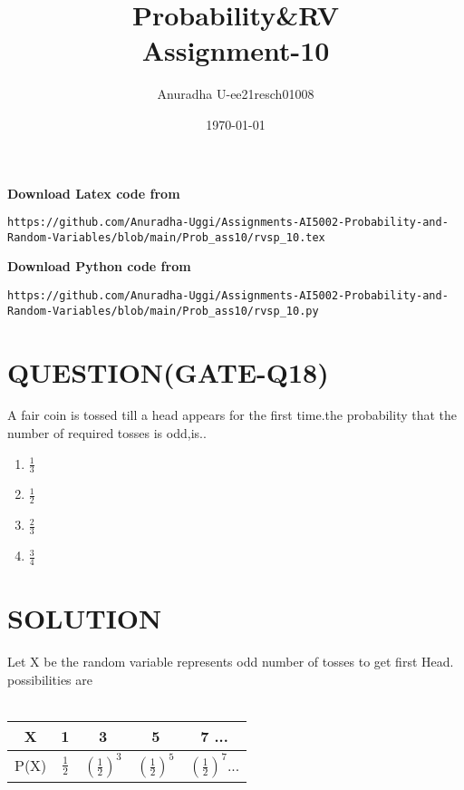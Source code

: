 \documentclass[journal,12pt,twocolumn]{IEEEtran}
\title{Probability\&RV \\ Assignment-10}
\author{Anuradha U-ee21resch01008}
\date{\today}
\begin{document}
\maketitle
\newpage
\bigskip
\renewcommand{\thefigure}{\theenumi}
\renewcommand{\thetable}{\theenumi}


\textbf{Download Latex code from}
\begin{lstlisting}
https://github.com/Anuradha-Uggi/Assignments-AI5002-Probability-and-Random-Variables/blob/main/Prob_ass10/rvsp_10.tex
\end{lstlisting}
\textbf{Download Python code from}
\begin{lstlisting}
https://github.com/Anuradha-Uggi/Assignments-AI5002-Probability-and-Random-Variables/blob/main/Prob_ass10/rvsp_10.py
\end{lstlisting}
\section{\textbf{QUESTION(GATE-Q18)}}
A fair coin is tossed till a head appears for the first time.the probability that the number of required tosses is odd,is..
\begin{enumerate}
    \item $\frac{1}{3}$\\
    \item $\frac{1}{2}$\\
    \item $\frac{2}{3}$\\
    \item $\frac{3}{4}$
\end{enumerate}

\section{\textbf{SOLUTION}}
Let X be the random variable represents odd number of tosses to get first Head.\\
possibilities are\\ \\
\begin{tabular}{|c|c|c|c|c}
  \hline
    X & 1 & 3 & 5 & 7 ...\\
  \hline
    P(X) & $\frac{1}{2}$ & $(\frac{1}{2})^3$ & $(\frac{1}{2})^5$ & $(\frac{1}{2})^7...$ \\
  \hline
\end{tabular}\\
\end{document}
